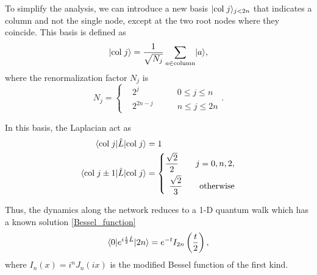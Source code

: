 To simplify the analysis, we can introduce a new basis $\lvert\mathrm{col}\; j\rangle_{j<2n}$ that indicates a column and not the single node, except at the two root nodes where they coincide. This basis is defined as
\begin{equation}
    \lvert\mathrm{col}\; j\rangle = \frac{1}{\sqrt{N_j}}\sum_{a\in \mathrm{column}} \lvert a\rangle, 
\end{equation}
where the renormalization factor $N_j$ is 
\begin{equation}
    N_j = \left\{\begin{aligned}
        &2^j \qquad &0\leq j\leq n\\
        &2^{2n-j} \qquad &n \leq j \leq 2n
    \end{aligned}\right. .
\end{equation}

In this basis, the Laplacian act as
\begin{equation}
    \begin{aligned}
        \langle\mathrm{col}\; j\rvert\hat L \lvert\mathrm{col}\; j\rangle &= 1\\
        \langle\mathrm{col}\; j \pm 1\rvert\hat L \lvert\mathrm{col}\; j\rangle &=\left\{\begin{aligned}
            \frac{\sqrt{2}}{2} \qquad j=0,n,2,\\
            \frac{\sqrt{2}}{3} \qquad \mathrm{otherwise}\\
        \end{aligned}\right.
    \end{aligned}
\end{equation}

Thus, the dynamics along the network reduces to a 1-D quantum walk which has a known solution \eqref{Bessel_function} %
\begin{equation}
    \langle0\rvert e^{i\frac{t}{2}\hat L}\lvert2n\rangle = e^{-t} I_{2n}\left(\frac{t}{2}\right),
\end{equation}
where $I_{n}(x) = i^{n}J_{n}(ix)$ is the modified Bessel function of the first kind.
